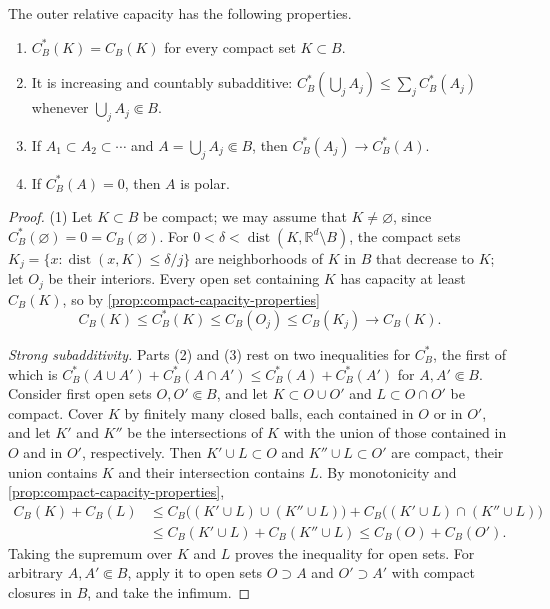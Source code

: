 \begin{theorem}\label{thm:outer-capacity}
The outer relative capacity has the following properties.
\begin{enumerate}
\item $C_B^*(K)=C_B(K)$ for every compact set $K\subset B$.
\item It is increasing and countably subadditive: $C_B^*(\bigcup_jA_j)\leq\sum_jC_B^*(A_j)$ whenever $\bigcup_jA_j\Subset B$.
\item If $A_1\subset A_2\subset\cdots$ and $A=\bigcup_jA_j\Subset B$, then $C_B^*(A_j)\to C_B^*(A)$.
\item If $C_B^*(A)=0$, then $A$ is polar.
\end{enumerate}
\end{theorem}
\begin{proof}
(1) Let $K\subset B$ be compact; we may assume that $K\neq\varnothing$, since $C_B^*(\varnothing)=0=C_B(\varnothing)$. For $0<\delta<\operatorname{dist}(K,\mathbb R^d\setminus B)$, the compact sets $K_j=\{x:\operatorname{dist}(x,K)\leq\delta/j\}$ are neighborhoods of $K$ in $B$ that decrease to $K$; let $O_j$ be their interiors. Every open set containing $K$ has capacity at least $C_B(K)$, so by \cref{prop:compact-capacity-properties}
\[
 C_B(K)\leq C_B^*(K)\leq C_B(O_j)\leq C_B(K_j)\longrightarrow C_B(K).
\]

\emph{Strong subadditivity.} Parts (2) and (3) rest on two inequalities for $C_B^*$, the first of which is $C_B^*(A\cup A')+C_B^*(A\cap A')\leq C_B^*(A)+C_B^*(A')$ for $A,A'\Subset B$. Consider first open sets $O,O'\Subset B$, and let $K\subset O\cup O'$ and $L\subset O\cap O'$ be compact. Cover $K$ by finitely many closed balls, each contained in $O$ or in $O'$, and let $K'$ and $K''$ be the intersections of $K$ with the union of those contained in $O$ and in $O'$, respectively. Then $K'\cup L\subset O$ and $K''\cup L\subset O'$ are compact, their union contains $K$ and their intersection contains $L$. By monotonicity and \cref{prop:compact-capacity-properties},
\[
 \begin{aligned}
 C_B(K)+C_B(L)&\leq C_B\bigl((K'\cup L)\cup(K''\cup L)\bigr)+C_B\bigl((K'\cup L)\cap(K''\cup L)\bigr)\\
 &\leq C_B(K'\cup L)+C_B(K''\cup L)\leq C_B(O)+C_B(O').
 \end{aligned}
\]
Taking the supremum over $K$ and $L$ proves the inequality for open sets. For arbitrary $A,A'\Subset B$, apply it to open sets $O\supset A$ and $O'\supset A'$ with compact closures in $B$, and take the infimum.


\end{proof}
